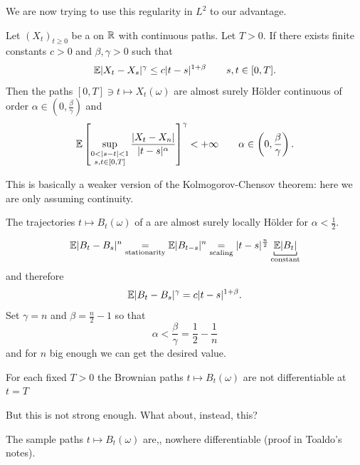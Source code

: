 \documentclass[crop=false, class=article]{standalone}
\begin{document}
We are now trying to use this regularity in $L^{2}$ to our advantage.
\begin{theorem}
	Let ${(X_{t})}_{t\geq0}$ be a \rp{} on $\mathbb{R}$ with continuous paths. Let $T>0$. If there exists finite constants $c>0$ and $\beta,\gamma>0$ such that
	\begin{equation*}
		\mathbb{E}|X_{t}-X_{s}|^{\gamma}\leq c|t-s|^{1+\beta}\qquad s,t\in[0,T].
	\end{equation*}
	Then the paths $[0,T]\ni t\mapsto X_{t}(\omega)$ are almost surely Hölder continuous of order $\alpha\in(0,\frac{\beta}{\gamma})$ and
	\begin{equation*}
		\ev\left[\sup_{\substack{0<|s-t|<1 \\ s,t\in[0,T]}}\frac{|X_{t}-X_{n}|}{|t-s|^{\alpha}} \right]^{\gamma}<+\infty\qquad\alpha\in\left(0,\frac{\beta}{\gamma}\right).
	\end{equation*}
\end{theorem} 
This is basically a weaker version of the Kolmogorov-Chensov theorem: here we are only assuming continuity.
\begin{corollary}
	The trajectories $t\mapsto B_{t}(\omega)$ of a \brm{} are almost surely locally Hölder for $\alpha<\frac{1}{2}$.
\end{corollary}
\begin{fancyproof}
	\begin{equation*}
		\ev|B_{t}-B_{s}|^{n}\underset{\text{stationarity}}{=}\ev|B_{t-s}|^{n}\underset{\text{scaling}}{=}|t-s|^{\frac{n}{2}}\underbracket[0.6pt]{\ev|B_{t}|}_{\text{constant}}
	\end{equation*}
	and therefore
	\begin{equation*}
		\mathbb{E}|B_{t}-B_{s}|^{\gamma}=c|t-s|^{1+\beta}.
	\end{equation*}
	Set $\gamma=n$ and $\beta=\frac{n}{2}-1$ so that
	\begin{equation*}
		\alpha<\frac{\beta}{\gamma}=\frac{1}{2}-\frac{1}{n}
	\end{equation*}
	and for $n$ big enough we can get the desired value.
\end{fancyproof}
\begin{proposition}
	For each fixed $T>0$ the Brownian paths $t\mapsto B_{t}(\omega)$ are not differentiable at $t=T$ \as{}
\end{proposition}
But this is not strong enough. What about, instead, this?
\begin{proposition}
	The sample paths $t\mapsto B_{t}(\omega)$ are,\as, nowhere differentiable (proof in Toaldo's notes).
\end{proposition}
\end{document}
